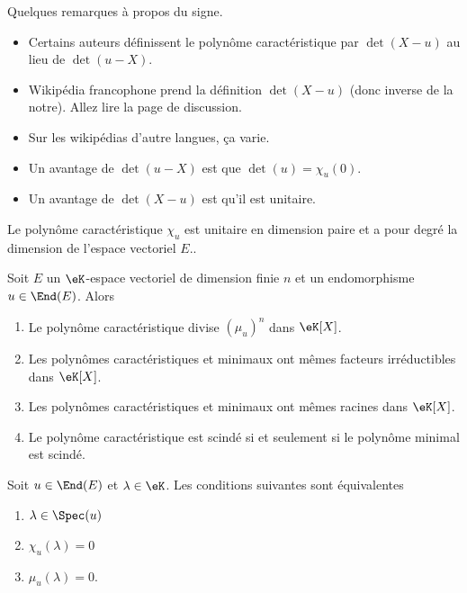 \begin{remark}
    Quelques remarques à propos du signe.
    \begin{itemize}
        \item
            Certains auteurs définissent le polynôme caractéristique par \( \det(X-u)\) au lieu de \( \det(u-X)\).
        \item
            Wikipédia francophone prend la définition \( \det(X-u)\) (donc inverse de la notre). Allez lire la page de discussion.
        \item
            Sur les wikipédias d'autre langues, ça varie.
        \item
            Un avantage de \( \det(u-X)\) est que \( \det(u)=\chi_u(0)\).
        \item
            Un avantage de \( \det(X-u)\) est qu'il est unitaire.
    \end{itemize}
\end{remark}

\begin{lemma}       \label{LemooWCZMooZqyaHd}
    Le polynôme caractéristique \( \chi_u\) est unitaire en dimension paire et a pour degré la dimension de l'espace vectoriel \( E\)..
\end{lemma}

\begin{theorem}     \label{ThoNhbrUL}
    Soit \( E\) un \(\eK\)-espace vectoriel de dimension finie \( n\) et un endomorphisme \( u\in\End(E)\). Alors
    \begin{enumerate}
        \item
            Le polynôme caractéristique divise \( (\mu_u)^n\) dans \(\eK[X]\).
        \item
            Les polynômes caractéristiques et minimaux ont mêmes facteurs irréductibles dans \(\eK[X]\).
        \item
            Les polynômes caractéristiques et minimaux ont mêmes racines dans \(\eK[X]\).
        \item
            Le polynôme caractéristique est scindé si et seulement si le polynôme minimal est scindé.
    \end{enumerate}
\end{theorem}

\begin{theorem} \label{ThoWDGooQUGSTL}
    Soit \( u\in\End(E)\) et \( \lambda\in\eK\). Les conditions suivantes sont équivalentes
    \begin{enumerate}
        \item\label{ItemeXHXhHi}
            \( \lambda\in\Spec(u)\)
        \item\label{ItemeXHXhHii}
            \( \chi_u(\lambda)=0\)
        \item\label{ItemeXHXhHiii}
            \( \mu_u(\lambda)=0\).
    \end{enumerate}
\end{theorem}

